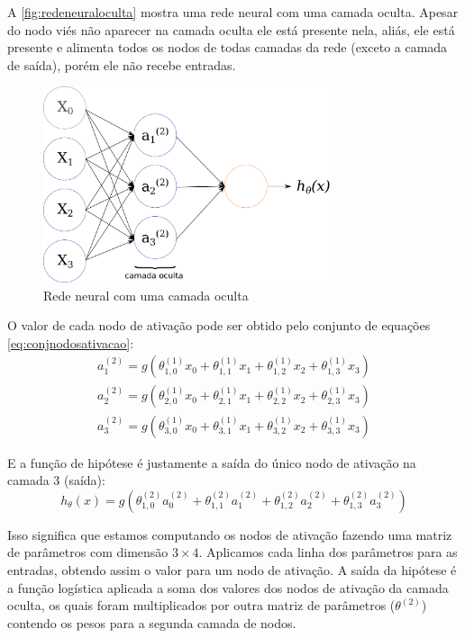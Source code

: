 A \autoref{fig:redeneuraloculta} mostra uma rede neural com uma camada oculta. Apesar do nodo viés não aparecer na camada oculta ele está presente nela, aliás, ele está presente e alimenta todos os nodos de todas camadas da rede (exceto a camada de saída), porém ele não recebe entradas.

\begin{figure}
\centering
\caption{Rede neural com uma camada oculta} \label{fig:redeneuraloculta}
\includegraphics[width=0.75\textwidth]{img/redeneuraloculta.pdf}
\end{figure}

O valor de cada nodo de ativação pode ser obtido pelo conjunto de equações \ref{eq:conjnodosativacao}:
\begin{align}
a_1^{(2)} = g(\theta_{1,0}^{(1)}x_0 + \theta_{1,1}^{(1)}x_1 + \theta_{1,2}^{(1)}x_2 + \theta_{1,3}^{(1)}x_3) \nonumber \\
a_2^{(2)} = g(\theta_{2,0}^{(1)}x_0 + \theta_{2,1}^{(1)}x_1 + \theta_{2,2}^{(1)}x_2 + \theta_{2,3}^{(1)}x_3) \nonumber \\
a_3^{(2)} = g(\theta_{3,0}^{(1)}x_0 + \theta_{3,1}^{(1)}x_1 + \theta_{3,2}^{(1)}x_2 + \theta_{3,3}^{(1)}x_3) \label{eq:conjnodosativacao}
\end{align}

E a função de hipótese é justamente a saída do único nodo de ativação na camada 3 (saída):
\begin{equation}
h_{\theta}(x) = g(\theta_{1,0}^{(2)}a_0^{(2)} + \theta_{1,1}^{(2)}a_1^{(2)} + \theta_{1,2}^{(2)}a_2^{(2)} + \theta_{1,3}^{(2)}a_3^{(2)}) \nonumber
\end{equation}

Isso significa que estamos computando os nodos de ativação fazendo uma matriz de parâmetros com dimensão $3 \times 4$. Aplicamos cada linha dos parâmetros para as entradas, obtendo assim o valor para um nodo de ativação. A saída da hipótese é a função logística aplicada a soma dos valores dos nodos de ativação da camada oculta, os quais foram multiplicados por outra matriz de parâmetros ($\theta^{(2)}$) contendo os pesos para a segunda camada de nodos.

